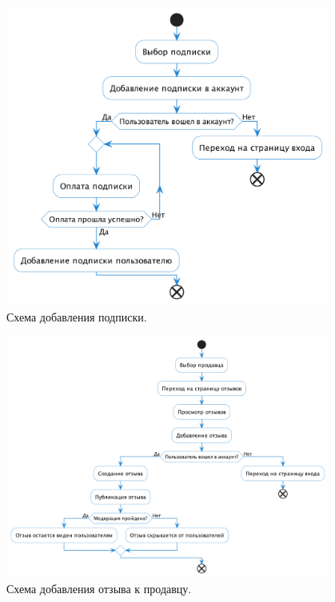 \documentclass[a4paper,14pt]{extarticle}
\begin{document}
\begin{figure}[H]
    \centering
    \includegraphics[width=0.95\textwidth]{images/subscription.png}
    \caption{Схема добавления подписки.}
\end{figure}

\begin{figure}[H]
    \centering
    \includegraphics[width=0.95\textwidth]{images/user_feedback.png}
    \caption{Схема добавления отзыва к продавцу.}
\end{figure}
\end{document}
